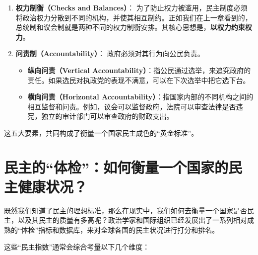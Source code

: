 \begin{enumerate}
    \item \textbf{权力制衡（Checks and Balances）}：
    为了防止权力被滥用，民主制度必须将政治权力分散到不同的机构，并使其相互制约。正如我们在上一章看到的，总统制和议会制就是两种不同的权力制衡安排。其核心思想是，\textbf{以权力约束权力}。

    \item \textbf{问责制（Accountability）}：
    政府必须对其行为向公民负责。
    \begin{itemize}
        \item \textbf{纵向问责（Vertical Accountability）}：指公民通过选举，来追究政府的责任。如果选民对执政党的表现不满意，可以在下次选举中把它选下台。
        \item \textbf{横向问责（Horizontal Accountability）}：指国家内部的不同机构之间的相互监督和问责。例如，议会可以监督政府，法院可以审查法律是否违宪，独立的审计部门可以审查政府的财政支出。
    \end{itemize}
\end{enumerate}

这五大要素，共同构成了衡量一个国家民主成色的“黄金标准”。

\hrulefill

\section{民主的“体检”：如何衡量一个国家的民主健康状况？}

既然我们知道了民主的理想标准，那么在现实中，我们如何去衡量一个国家是否民主，以及其民主的质量有多高呢？政治学家和国际组织已经发展出了一系列相对成熟的“体检”指标和数据库，来对全球各国的民主状况进行打分和排名。

这些“民主指数”通常会综合考量以下几个维度：

